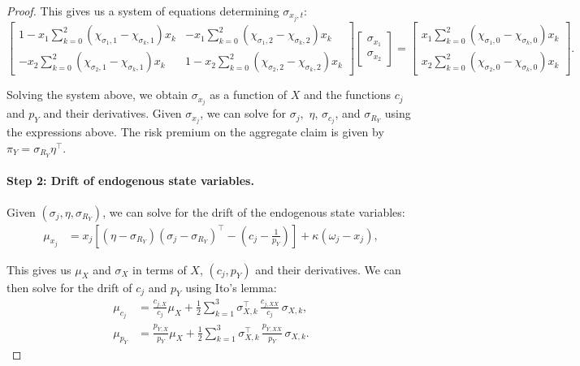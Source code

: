 \begin{proof}
    This gives us a system of equations determining $\sigma_{x_j,t}$:\small
    \begin{equation}
            \begin{bmatrix}
                1 - x_{1} \sum_{k=0}^2 \left( \chi_{\sigma_1,1} - \chi_{\sigma_k,1} \right) x_{k} & - x_{1} \sum_{k=0}^2 \left( \chi_{\sigma_1,2} - \chi_{\sigma_k,2} \right) x_{k}\\
                - x_{2} \sum_{k=0}^2 \left( \chi_{\sigma_2,1} - \chi_{\sigma_k,1} \right) x_{k} & 1 - x_{2} \sum_{k=0}^2 \left( \chi_{\sigma_2,2} - \chi_{\sigma_k,2} \right) x_{k}
            \end{bmatrix}
            \begin{bmatrix}
                \sigma_{x_1}\\
                \sigma_{x_2}
            \end{bmatrix}
            =
            \begin{bmatrix}
              x_{1} \sum_{k=0}^2 \left( \chi_{\sigma_1,0} - \chi_{\sigma_k,0} \right) x_{k} \\
              x_{2} \sum_{k=0}^2 \left( \chi_{\sigma_2,0} - \chi_{\sigma_k,0} \right) x_{k}
            \end{bmatrix}.
    \end{equation}\normalsize
    
    Solving the system above, we obtain $\sigma_{x_j}$ as a function of $X$ and the functions $c_j$ and $p_{Y}$ and their derivatives.
    Given $\sigma_{x_j}$, we can solve for $\sigma_{j},$ $\eta$, $\sigma_{c_j}$, and $\sigma_{R_Y}$ using the expressions above. 
    The risk premium on the aggregate claim is given by $\pi_{Y} = \sigma_{R_Y} \eta^\top$.

    \paragraph{Step 2: Drift of endogenous state variables.} 
Given $(\sigma_j, \eta, \sigma_{R_Y})$, we can solve for the drift of the endogenous state variables:
\begin{align}
    \mu_{x_j} &= x_{j} \left[ 
        (\eta-\sigma_{R_Y}) \left( \sigma_{j} -\sigma_{R_Y} \right)^\top - \left( c_{j} - \frac{1}{p_{Y}}  \right)
     \right] + \kappa (\omega_j - x_{j}),
\end{align}

This gives us $\mu_{X}$ and $\sigma_{X}$ in terms of $X$, $(c_j,p_Y)$ and their derivatives.
We can then solve for the drift of $c_j$ and $p_{Y}$ using Ito's lemma:
\begin{align}
    \mu_{c_j} &= \frac{c_{j,X}}{c_{j}} \mu_{X} + \frac{1}{2}\sum_{k=1}^3 \sigma_{X,k}^\top\,\frac{c_{j,XX}}{c_{j}}\,\sigma_{X,k},\\
    \mu_{p_Y} &= \frac{p_{Y,X}}{p_{Y}} \mu_{X} + \frac{1}{2}\sum_{k=1}^3 \sigma_{X,k}^\top\,\frac{p_{Y,XX}}{p_{Y}}\,\sigma_{X,k}.
\end{align}


\end{proof}
